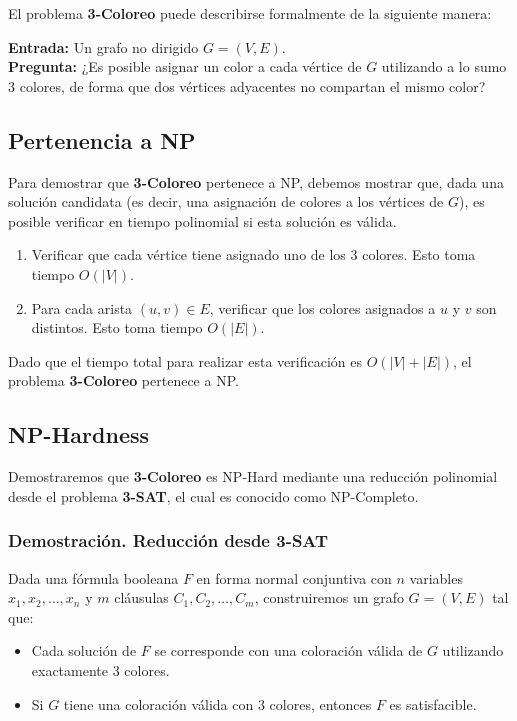 \documentclass[a4paper,12pt]{article}
\begin{document}
El problema \textbf{3-Coloreo} puede describirse formalmente de la siguiente manera:

\textbf{Entrada:} Un grafo no dirigido $G = (V, E)$.\\
\textbf{Pregunta:} ¿Es posible asignar un color a cada v\'ertice de $G$ utilizando a lo sumo 3 colores, de forma que dos v\'ertices adyacentes no compartan el mismo color?

\subsection{Pertenencia a NP}
Para demostrar que \textbf{3-Coloreo} pertenece a NP, debemos mostrar que, dada una soluci\'on candidata (es decir, una asignaci\'on de colores a los v\'ertices de $G$), es posible verificar en tiempo polinomial si esta soluci\'on es v\'alida.

\begin{enumerate}
    \item Verificar que cada v\'ertice tiene asignado uno de los 3 colores. Esto toma tiempo $O(|V|)$.
    \item Para cada arista $(u, v) \in E$, verificar que los colores asignados a $u$ y $v$ son distintos. Esto toma tiempo $O(|E|)$.
\end{enumerate}

Dado que el tiempo total para realizar esta verificaci\'on es $O(|V| + |E|)$, el problema \textbf{3-Coloreo} pertenece a NP.

\subsection{NP-Hardness}
Demostraremos que \textbf{3-Coloreo} es NP-Hard mediante una reducci\'on polinomial desde el problema \textbf{3-SAT}, el cual es conocido como NP-Completo.

\subsubsection{Demostración. Reducci\'on desde 3-SAT}
Dada una f\'ormula booleana $F$ en forma normal conjuntiva con $n$ variables $x_1, x_2, \dots, x_n$ y $m$ cl\'ausulas $C_1, C_2, \dots, C_m$, construiremos un grafo $G = (V, E)$ tal que:
\begin{itemize}
    \item Cada soluci\'on de $F$ se corresponde con una coloraci\'on v\'alida de $G$ utilizando exactamente 3 colores.
    \item Si $G$ tiene una coloraci\'on v\'alida con 3 colores, entonces $F$ es satisfacible.
\end{itemize}
\end{document}
